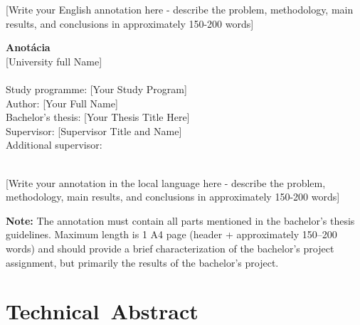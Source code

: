 \documentclass[11pt,a4paper,oneside]{book}
\newcommand{\thesistitle}{[Your Thesis Title Here]}
\newcommand{\authorname}{[Your Full Name]}
\newcommand{\studyprogram}{[Your Study Program]}
\newcommand{\universityName}{[University full Name]}
\newcommand{\facultName}{[Faculty full Name]}
\newcommand{\supervisor}{[Supervisor Title and Name]}
\newcommand{\additionalsupervisor}{} %
\newcommand{\submissiondate}{[Month Year]}
\begin{document}
[Write your English annotation here - describe the problem, methodology, main results, and conclusions in approximately 150-200 words]

\newpage
\thispagestyle{empty}
\mbox{}

\newpage
\thispagestyle{empty}

\begin{flushleft}
{\large \textbf{Anotácia}}\\[0.25cm]

\universityName\\
\facultName\\[0.5cm]


Study programme: \studyprogram\\
Author: \authorname\\
Bachelor's thesis: \thesistitle\\
Supervisor: \supervisor\\
\ifx\additionalsupervisor\empty\else
Additional supervisor: \additionalsupervisor\\
\fi
\submissiondate\\[1cm]
\end{flushleft}

[Write your annotation in the local language here - describe the problem, methodology, main results, and conclusions in approximately 150-200 words]

\textbf{Note:} The annotation must contain all parts mentioned in the bachelor's thesis guidelines. Maximum length is 1 A4 page (header + approximately 150–200 words) and should provide a brief characterization of the bachelor's project assignment, but primarily the results of the bachelor's project.

\newpage
\thispagestyle{empty}
\mbox{}

\newpage
\setcounter{page}{11} %
\tableofcontents

 \newpage
 \listoffigures
 
 \newpage
 \listoftables

\newpage
{}
\setcounter{page}{1}

\chapter*{Technical~Abstract}
\end{document}
